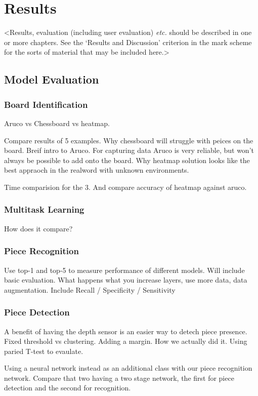 \chapter{Results}
\label{chapter3}

<Results, evaluation (including user evaluation) {\em etc.} should be described in one or more chapters. See the `Results and Discussion' criterion in the mark scheme for the sorts of material that may be included here.>

\section{Model Evaluation}

\subsection{Board Identification}
Aruco vs Chessboard vs heatmap. 

Compare results of 5 examples.  Why chessboard \cite{} will struggle with peices on the board.
Breif intro to Aruco.  For capturing data Aruco is very reliable, but won't always be possible to add onto the board.
Why heatmap solution looks like the best appraoch in the realword with unknown environments.  \cite{}

Time comparision for the 3.  And compare accuracy of heatmap against aruco.

\subsection{Multitask Learning}
How does it compare?

\subsection{Piece Recognition}
Use top-1 and top-5 to measure performance of different models.
Will include basic evaluation.  What happens what you increase layers, use more data, data augmentation.
Include Recall / Specificity / Sensitivity

\subsection{Piece Detection}
A benefit of having the depth sensor is an easier way to detech piece presence.  
Fixed threshold vs clustering.  Adding a margin.  How we actually did it.
Using paried T-test to evaulate.

Using a neural network instead as an additional class with our piece recognition network.
Compare that two having a two stage network, the first for piece detection and the second for recognition.

